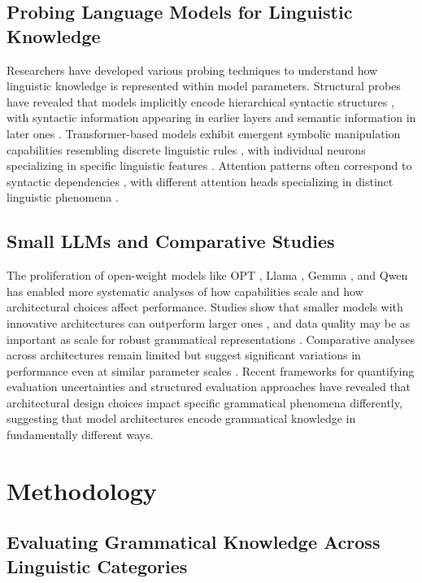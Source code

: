 \documentclass{article}
\begin{document}
\subsection{Probing Language Models for Linguistic Knowledge}
Researchers have developed various probing techniques to understand how linguistic knowledge is represented within model parameters. Structural probes have revealed that models implicitly encode hierarchical syntactic structures \citep{hewitt2019structural}, with syntactic information appearing in earlier layers and semantic information in later ones \citep{tenney2019bert}. Transformer-based models exhibit emergent symbolic manipulation capabilities resembling discrete linguistic rules \citep{manning2020emergent}, with individual neurons specializing in specific linguistic features \citep{geva2021transformer}. Attention patterns often correspond to syntactic dependencies \citep{levy2018emergence}, with different attention heads specializing in distinct linguistic phenomena \citep{clark2019does}.

\subsection{Small LLMs and Comparative Studies}
The proliferation of open-weight models like OPT \citep{zhang2022opt}, Llama \citep{touvron2023llama}, Gemma \citep{jiang2023mistral}, and Qwen \citep{bai2023qwen} has enabled more systematic analyses of how capabilities scale and how architectural choices affect performance. Studies show that smaller models with innovative architectures can outperform larger ones \citep{jiang2023mistral}, and data quality may be as important as scale for robust grammatical representations \citep{bai2023qwen}. Comparative analyses across architectures remain limited but suggest significant variations in performance even at similar parameter scales \citep{talmor2020olmpics, zhao2023survey}. Recent frameworks for quantifying evaluation uncertainties \citep{roberts2023quantifying} and structured evaluation approaches \citep{xia2023structured} have revealed that architectural design choices impact specific grammatical phenomena differently, suggesting that model architectures encode grammatical knowledge in fundamentally different ways.

\section{Methodology}
\subsection{Evaluating Grammatical Knowledge Across Linguistic Categories}
\end{document}

